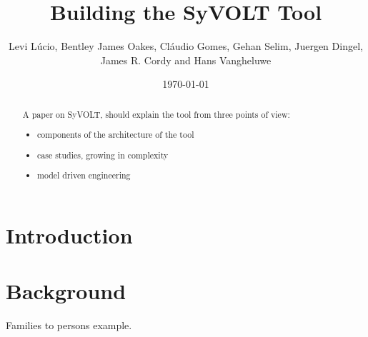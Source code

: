 \documentclass[conference]{IEEEtran}
\begin{document}
\title{Building the SyVOLT Tool}
\author{Levi L\'{u}cio, Bentley James Oakes, Cl\'audio Gomes, Gehan Selim,
Juergen Dingel, James R. Cordy and Hans Vangheluwe}

\author{
	}

\date{\today}


\maketitle



\begin{abstract}
A paper on SyVOLT, should explain the tool from three points of view:
\begin{itemize}
  \item components of the architecture of the tool
  \item case studies, growing in complexity
  \item model driven engineering
\end{itemize}

\end{abstract}


\section{Introduction}
\label{sec:intro}


\section{Background}
 
Families to persons example.
\end{document}
